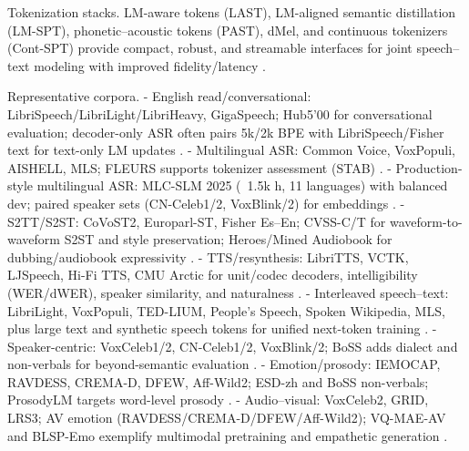 \documentclass{article}
\begin{document}
Tokenization stacks. LM-aware tokens (LAST), LM-aligned semantic distillation (LM-SPT), phonetic--acoustic tokens (PAST), dMel, and continuous tokenizers (Cont-SPT) provide compact, robust, and streamable interfaces for joint speech--text modeling with improved fidelity/latency \cite{turetzky2024lastlanguagemodelawarespeechtokenization,jo2025lmsptalignedsemanticdistillationspeechto,har-tuv2025pastphoneticacousticspeechtokenizer,li2025continuousspeechtokenizertext,bai2025dmelspeechtokenizationmadesimple}.

Representative corpora.
- English read/conversational: LibriSpeech/LibriLight/LibriHeavy, GigaSpeech; Hub5'00 for conversational evaluation; decoder-only ASR often pairs 5k/2k BPE with LibriSpeech/Fisher text for text-only LM updates \cite{tsunoo2024decoderonlyarchitecturespeechrecognition}.
- Multilingual ASR: Common Voice, VoxPopuli, AISHELL, MLS; FLEURS supports tokenizer assessment (STAB) \cite{vashishth2024stabspeechtokenizerassessmentbenchmark}.
- Production-style multilingual ASR: MLC-SLM 2025 (~1.5k h, 11 languages) with balanced dev; paired speaker sets (CN-Celeb1/2, VoxBlink/2) for embeddings \cite{li2025seewossubmissionmlcslmlessonslearnedspee}.
- S2TT/S2ST: CoVoST2, Europarl-ST, Fisher Es--En; CVSS-C/T for waveform-to-waveform S2ST and style preservation; Heroes/Mined Audiobook for dubbing/audiobook expressivity \cite{peng2024mslms2stmultitaskspeechlanguagemodeltext,zhao2024textlessstreamingspeechtranslationsemant,huang2023holisticcascadesystembenchmarkhumanevalu,guo2025streamuniachievingstreamingspeechtransla}.
- TTS/resynthesis: LibriTTS, VCTK, LJSpeech, Hi-Fi TTS, CMU Arctic for unit/codec decoders, intelligibility (WER/dWER), speaker similarity, and naturalness \cite{turetzky2024lastlanguagemodelawarespeechtokenization,wang2023slmbridgethingapbetweenspeechtextfoundat,entry2025towardjointlanguagemodelingspeechunitste}.
- Interleaved speech--text: LibriLight, VoxPopuli, TED-LIUM, People's Speech, Spoken Wikipedia, MLS, plus large text and synthetic speech tokens for unified next-token training \cite{zeng2024scalingspeechtextpretrainingsyntheticint,maimon2025scalinganalysisinterleavedspeechtextlang,li2025continuousspeechtokenizertext,bai2025dmelspeechtokenizationmadesimple}.
- Speaker-centric: VoxCeleb1/2, CN-Celeb1/2, VoxBlink/2; BoSS adds dialect and non-verbals for beyond-semantic evaluation \cite{li2025seewossubmissionmlcslmlessonslearnedspee,wang2025bossbeyondsemanticspeech}.
- Emotion/prosody: IEMOCAP, RAVDESS, CREMA-D, DFEW, Aff-Wild2; ESD-zh and BoSS non-verbals; ProsodyLM targets word-level prosody \cite{qian2025prosodylmuncoveringemergingprosodyproces,wang2025bossbeyondsemanticspeech,vashishth2024stabspeechtokenizerassessmentbenchmark}.
- Audio--visual: VoxCeleb2, GRID, LRS3; AV emotion (RAVDESS/CREMA-D/DFEW/Aff-Wild2); VQ-MAE-AV and BLSP-Emo exemplify multimodal pretraining and empathetic generation \cite{sadok2025vectorquantizedmaskedautoencoderaudiovis,wang2024blspemotowardsempatheticlargespeechlangu}.
\end{document}
